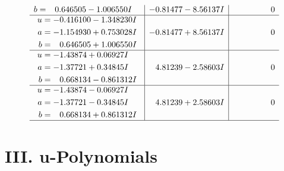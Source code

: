 \documentclass[1p]{elsarticle_modified}
\theoremstyle{definition}
\begin{document}
$$\begin{array}{c|c|c}
\begin{aligned}
b &= \phantom{-}0.646505 - 1.006550 I\end{aligned}
 & -0.81477 - 8.56137 I & \phantom{-0.000000 } 0 \\ \hline\begin{aligned}
u &= -0.416100 - 1.348230 I \\
a &= -1.154930 + 0.753028 I \\
b &= \phantom{-}0.646505 + 1.006550 I\end{aligned}
 & -0.81477 + 8.56137 I & \phantom{-0.000000 } 0 \\ \hline\begin{aligned}
u &= -1.43874 + 0.06927 I \\
a &= -1.37721 + 0.34845 I \\
b &= \phantom{-}0.668134 - 0.861312 I\end{aligned}
 & \phantom{-}4.81239 - 2.58603 I & \phantom{-0.000000 } 0 \\ \hline\begin{aligned}
u &= -1.43874 - 0.06927 I \\
a &= -1.37721 - 0.34845 I \\
b &= \phantom{-}0.668134 + 0.861312 I\end{aligned}
 & \phantom{-}4.81239 + 2.58603 I & \phantom{-0.000000 } 0\\
 \hline 
 \end{array}$$\newpage
\newpage\renewcommand{\arraystretch}{1}
\centering \section*{ III. u-Polynomials}
\end{document}
